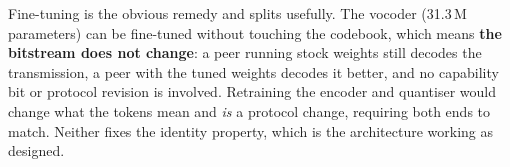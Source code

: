 Fine-tuning is the obvious remedy and splits usefully.  The
vocoder (31.3\,M parameters) can be fine-tuned without touching the
codebook, which means \textbf{the bitstream does not change}: a peer
running stock weights still decodes the transmission, a peer with the
tuned weights decodes it better, and no capability bit or protocol
revision is involved.  Retraining the encoder and quantiser would
change what the tokens mean and \emph{is} a protocol change, requiring
both ends to match.  Neither fixes the identity property, which is the
architecture working as designed.
